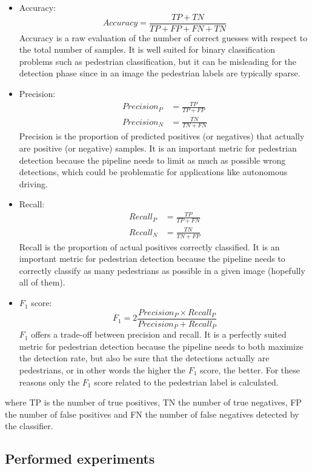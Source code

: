 \documentclass[journal,twocolumn]{IEEEtran}
\begin{document}
\begin{itemize}
\item Accuracy:
\begin{equation*}
Accuracy=\frac{TP+TN}{TP+FP+FN+TN}
\end{equation*}
Accuracy is a raw evaluation of the number of correct guesses with respect to the total number of samples. It is well suited for binary classification problems such as pedestrian classification, but it can be misleading for the detection phase since in an image the pedestrian labels are typically sparse.
\item Precision:
\begin{align*}
Precision_P &= \frac{TP}{TP+FP}\\
Precision_N &= \frac{TN}{TN+FN}
\end{align*}
Precision is the proportion of predicted positives (or negatives) that actually are positive (or negative) samples. It is an important metric for pedestrian detection because the pipeline needs to limit as much as possible wrong detections, which could be problematic for applications like autonomous driving.
\item Recall:
\begin{align*}
Recall_P &= \frac{TP}{TP+FN}\\
Recall_N &= \frac{TN}{TN+FP}
\end{align*}
Recall is the proportion of actual positives correctly classified. It is an important metric for pedestrian detection because the pipeline needs to correctly classify as many pedestrians as possible in a given image (hopefully all of them).
\item $F_1$ score:
\begin{equation*}
F_1=2\frac{Precision_P\times Recall_P}{Precision_P + Recall_P}
\end{equation*}
$F_1$ offers a trade-off between precision and recall. It is a perfectly suited metric for pedestrian detection because the pipeline needs to both maximize the detection rate, but also be sure that the detections actually are pedestrians, or in other words the higher the $F_1$ score, the better. For these reasons only the $F_1$ score related to the pedestrian label is calculated.
\end{itemize}

where TP is the number of true positives, TN the number of true negatives, FP the number of false positives and FN the number of false negatives detected by the classifier.

\subsection{Performed experiments}
\end{document}
